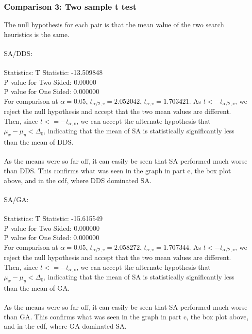 \documentclass[12pt]{article}
\begin{document}
\subsubsection{Comparison 3: Two sample t test}

The null hypothesis for each pair is that the mean value of the two search heuristics is the same.\\\\

SA/DDS:\\\\
Statistics: T Statistic: -13.509848\\
P value for Two Sided: 0.00000\\
P value for One Sided: 0.000000\\

For comparison at $\alpha = 0.05$, $t_{\alpha/2,v} = 2.052042$, $t_{\alpha, v}  = 1.703421$. As $t < -t_{\alpha/2,v}$, we reject the null hypothesis and accept that the two mean values are different. Then, since $t <= -t_{\alpha, v}$, we can accept the alternate hypothesis that $\mu_x - \mu_y < \Delta_0$, indicating that the mean of SA is statistically significantly less than the mean of DDS.\\\\
As the means were so far off, it can easily be seen that SA performed much worse than DDS. This confirms what was seen in the graph in part c, the box plot above, and in the cdf, where DDS dominated SA.\\\\

SA/GA:\\\\
Statistics: T Statistic: -15.615549\\
P value for Two Sided: 0.000000\\
P value for One Sided: 0.000000\\

For comparison at $\alpha = 0.05$, $t_{\alpha/2,v} = 2.058272$, $t_{\alpha, v}  = 1.707344$. As $t < -t_{\alpha/2,v}$, we reject the null hypothesis and accept that the two mean values are different. Then, since $t <= -t_{\alpha, v}$, we can accept the alternate hypothesis that $\mu_x - \mu_y < \Delta_0$, indicating that the mean of SA is statistically significantly less than the mean of GA.\\\\
As the means were so far off, it can easily be seen that SA performed much worse than GA. This confirms what was seen in the graph in part c, the box plot above, and in the cdf, where GA dominated SA.\\\\
\end{document}
